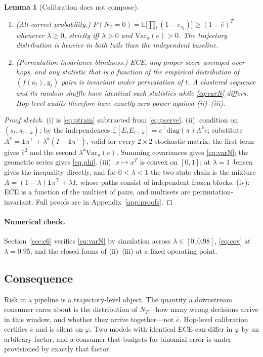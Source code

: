 \documentclass[11pt,a4paper]{article}
\numberwithin{equation}{section}
\theoremstyle{plain}
\newtheorem{lemma}{Lemma}
\theoremstyle{definition}
\theoremstyle{remark}
\newcommand{\E}{\mathbb{E}}
\newcommand{\Var}{\mathrm{Var}}
\begin{document}
\begin{lemma}[Calibration does not compose]
\begin{enumerate}[label=(\roman*),leftmargin=2em]
\item \textup{(All-correct probability.)} $P(N_T=0) = \E\bigl[\prod_t(1-e_{s_t})\bigr] \ge (1-\bar e)^T$ whenever $\lambda\ge 0$, strictly iff $\lambda>0$ and $\Var_\pi(e)>0$. The trajectory distribution is heavier in \emph{both} tails than the independent baseline.
\item \textup{(Permutation-invariance blindness.)} ECE, any proper score averaged over hops, and any statistic that is a function of the empirical distribution of $(f(o_t),y_t)$ pairs is invariant under permutation of $t$. A clustered sequence and its random shuffle have identical such statistics while \eqref{eq:varN} differs. Hop-level audits therefore have exactly zero power against (ii)--(iii).
\end{enumerate}
\end{lemma}

\begin{proof}[Proof sketch]
(i) is \eqref{eq:ptrain} subtracted from \eqref{eq:pserve}. (ii): condition on $(s_t,s_{t+k})$; by the independences $\E[E_tE_{t+k}] = e^\top\mathrm{diag}(\pi)A^k e$; substitute $A^k = \mathbf 1\pi^\top + \lambda^k(I-\mathbf 1\pi^\top)$, valid for every $2\times2$ stochastic matrix; the first term gives $\bar e^2$ and the second $\lambda^k\Var_\pi(e)$. Summing covariances gives \eqref{eq:varN}; the geometric series gives \eqref{eq:phi}. (iii): $x\mapsto x^T$ is convex on $[0,1]$; at $\lambda=1$ Jensen gives the inequality directly, and for $0<\lambda<1$ the two-state chain is the mixture $A = (1-\lambda)\mathbf 1\pi^\top + \lambda I$, whose paths consist of independent frozen blocks. (iv): ECE is a function of the multiset of pairs, and multisets are permutation-invariant. Full proofs are in Appendix~\ref{app:proofs}.
\end{proof}

\paragraph{Numerical check.} Section~\ref{sec:e6} verifies \eqref{eq:varN} by simulation across $\lambda\in[0,0.98]$, \eqref{eq:cov} at $\lambda=0.95$, and the closed forms of (ii)--(iii) at a fixed operating point.

\subsection{Consequence}

Risk in a pipeline is a trajectory-level object. The quantity a downstream consumer cares about is the distribution of $N_T$---how many wrong decisions arrive in this window, and whether they arrive together---not $\bar e$. Hop-level calibration certifies $\bar e$ and is silent on $\varphi$. Two models with identical ECE can differ in $\varphi$ by an arbitrary factor, and a consumer that budgets for binomial error is under-provisioned by exactly that factor.
\end{document}
